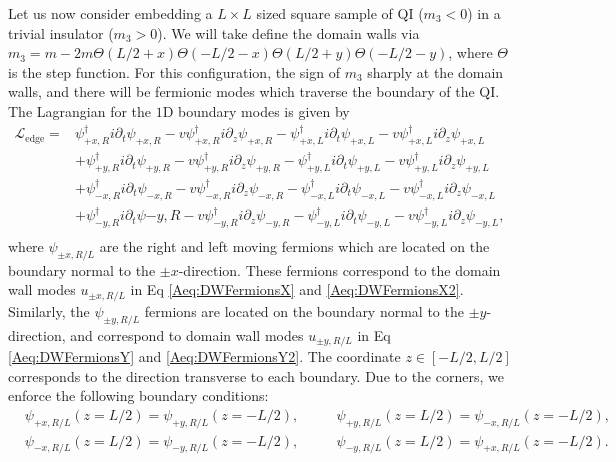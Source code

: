 \documentclass[%
 reprint,
 amsmath,amssymb,
 aps,
]{revtex4-1}
\begin{document}
\begin{appendix}
Let us now consider embedding a $L \times L$ sized square sample of QI ($m_3<0$) in a trivial insulator ($m_3>0$). We will take define the domain walls via $m_3 = m-2m\Theta(L/2+x)\Theta(-L/2-x)\Theta(L/2+y)\Theta(-L/2-y)$, where $\Theta$ is the step function. For this configuration, the sign of $m_3$ sharply at the domain walls, and there will be fermionic modes which traverse the boundary of the QI. The Lagrangian for the $1$D boundary modes is given by
\begin{equation}\begin{split}
\mathcal{L}_{\text{edge}} = &\psi^\dagger_{+x,R} i\partial_t \psi_{+x,R} -  v \psi^\dagger_{+x,R} i\partial_z \psi_{+x,R} - \psi^\dagger_{+x,L} i\partial_t \psi_{+x,L} -  v \psi^\dagger_{+x,L} i\partial_z \psi_{+x,L}\\
&+\psi^\dagger_{+y,R} i\partial_t \psi_{+y,R} -  v \psi^\dagger_{+y,R} i\partial_z \psi_{+y,R} - \psi^\dagger_{+y,L} i\partial_t \psi_{+y,L} -  v \psi^\dagger_{+y,L} i\partial_z \psi_{+y,L}\\
&+\psi^\dagger_{-x,R} i\partial_t \psi_{-x,R} -  v \psi^\dagger_{-x,R} i\partial_z \psi_{-x,R} - \psi^\dagger_{-x,L} i\partial_t \psi_{-x,L} -  v \psi^\dagger_{-x,L} i\partial_z \psi_{-x,L}\\
&+\psi^\dagger_{-y,R} i\partial_t \psi{-y,R} -  v \psi^\dagger_{-y,R} i\partial_z \psi_{-y,R} - \psi^\dagger_{-y,L} i\partial_t \psi_{-y,L} -  v \psi^\dagger_{-y,L} i\partial_z \psi_{-y,L},\\
\label{Aeq:DWLag}\end{split}\end{equation}
where $\psi_{\pm x,R/L}$ are the right and left moving fermions which are located on the boundary normal to the $\pm x$-direction. These fermions correspond to the domain wall modes $u_{\pm x,R/L}$ in Eq \ref{Aeq:DWFermionsX} and \ref{Aeq:DWFermionsX2}. Similarly, the $\psi_{\pm y,R/L}$ fermions are located on the boundary normal to the $\pm y$-direction, and correspond to domain wall modes $u_{\pm y,R/L}$ in Eq \ref{Aeq:DWFermionsY} and \ref{Aeq:DWFermionsY2}. The coordinate $z \in [-L/2,L/2]$ corresponds to the direction transverse to each boundary. Due to the corners, we enforce the following boundary conditions: 
\begin{equation}\begin{split}
    &\psi_{+x,R/L}(z = L/2) = \psi_{+y,R/L}(z = -L/2),\phantom{==} \psi_{+y,R/L}(z = L/2) = \psi_{-x,R/L}(z = -L/2),\\ & \psi_{-x,R/L}(z = L/2) = \psi_{-y,R/L}(z = -L/2), \phantom{==} \psi_{-y,R/L}(z = L/2) = \psi_{+x,R/L}(z = -L/2).
\end{split}\end{equation}


\end{appendix}
\end{document}
